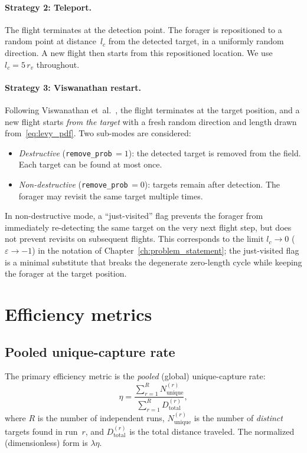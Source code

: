 \paragraph{Strategy 2: Teleport.}
The flight terminates at the detection point.  The forager
is repositioned to a random point at distance~$l_c$ from the
detected target, in a uniformly random direction.
A new flight then starts from this repositioned location.
We use $l_c = 5\,r_v$ throughout.

\paragraph{Strategy 3: Viswanathan restart.}
Following Viswanathan et~al.~\cite{viswanathan1999optimizing},
the flight terminates at the target position, and a new
flight starts \emph{from the target} with a fresh random
direction and length drawn from~\eqref{eq:levy_pdf}.
Two sub-modes are considered:
\begin{itemize}
  \item \emph{Destructive} (\texttt{remove\_prob}\,$= 1$): the detected
        target is removed from the field.  Each target can be
        found at most once.
  \item \emph{Non-destructive} (\texttt{remove\_prob}\,$= 0$): targets
        remain after detection.  The forager may revisit the
        same target multiple times.
\end{itemize}

In non-destructive mode, a ``just-visited'' flag prevents the
forager from immediately re-detecting the same target on the
very next flight step, but does not prevent revisits on
subsequent flights.  This corresponds to the
limit $l_c \to 0$ ($\varepsilon \to -1$) in the notation of
Chapter~\ref{ch:problem_statement}; the just-visited flag is a
minimal substitute that breaks the degenerate zero-length cycle
while keeping the forager at the target position.

\section{Efficiency metrics}
\label{sec:metrics}

\subsection{Pooled unique-capture rate}

The primary efficiency metric is the \emph{pooled} (global)
unique-capture rate:
\begin{equation}
  \eta = \frac{\sum_{r=1}^{R} N_{\mathrm{unique}}^{(r)}}
              {\sum_{r=1}^{R} D_{\mathrm{total}}^{(r)}},
  \label{eq:eta}
\end{equation}
where $R$ is the number of independent runs,
$N_{\mathrm{unique}}^{(r)}$ is the number of \emph{distinct}
targets found in run~$r$, and $D_{\mathrm{total}}^{(r)}$ is the
total distance traveled.  The normalized (dimensionless) form is
$\lambda\eta$.

